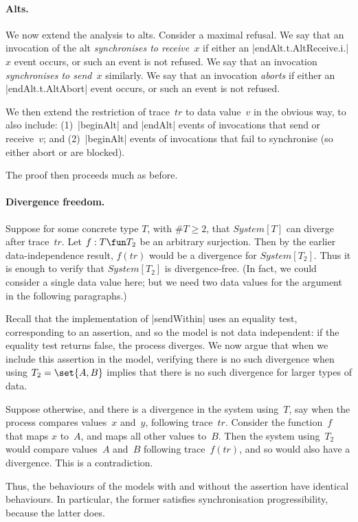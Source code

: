 
\paragraph{Alts.}

We now extend the analysis to alts.  Consider a maximal refusal.  We say that
an invocation of the alt \emph{synchronises to receive~$x$} if either an
|endAlt.t.AltReceive.i.|$x$ event occurs, or such an event is not refused.  We
say that an invocation \emph{synchronises to send~$x$} similarly.  We say that
an invocation \emph{aborts} if either an |endAlt.t.AltAbort| event occurs, or
such an event is not refused.

We then extend the restriction of trace~$tr$ to data value~$v$ in the obvious
way, to also include: (1)~|beginAlt| and |endAlt| events of invocations that
send or receive~$v$; and (2)~|beginAlt| events of invocations that fail to
synchronise (so either abort or are blocked).

The proof then proceeds much as before.


\paragraph{Divergence freedom.}

Suppose  for some concrete type $T$, with $\#T \ge 2$, that $System[T]$
can diverge after trace~$tr$.  Let $f : T \fun T_2$ be an arbitrary
surjection.  Then by the earlier data-independence result, $f(tr)$ would be a
divergence for $System[T_2]$.  Thus it is enough to verify that $System[T_2]$
is divergence-free.  (In fact, we could consider a single data value here; but
we need two data values for the argument in the following paragraphs.)

Recall that the implementation of |sendWithin| uses an equality test,
corresponding to an assertion, and so the model is not data independent: if
the equality test returns false, the process diverges.  We now argue that when
we include this assertion in the model, verifying there is no such divergence
when using $T_2 = \set{A, B}$ implies that there is no such divergence for
larger types of data.

Suppose otherwise, and there is a divergence in the system using~$T$, say when
the process compares values~$x$ and~$y$, following trace~$tr$.  Consider the
function~$f$ that maps $x$ to~$A$, and maps all other values to~$B$.  Then the
system using~$T_2$ would compare values~$A$ and~$B$ following trace~$f(tr)$,
and so would also have a divergence.  This is a contradiction.

Thus, the behaviours of the models with and without the assertion have
identical behaviours.  In particular, the former satisfies synchronisation
progressibility, because the latter does. 

